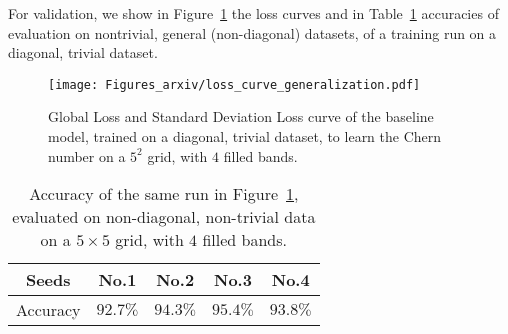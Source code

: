 For validation, we show in Figure~\ref{fig:diag-loss} the loss curves and in Table~\ref{tab:diag-acc} accuracies of evaluation on nontrivial, general (non-diagonal) datasets, of a training run on a diagonal, trivial dataset.
\begin{figure}
    \centering
    \texttt{[image: Figures\_arxiv/loss\_curve\_generalization.pdf]}
    \caption{Global Loss and Standard Deviation Loss curve of the baseline model, trained on a diagonal, trivial dataset, to learn the Chern number on a $5^2$ grid, with $4$ filled bands.}
    \label{fig:diag-loss}
\end{figure}
 \begin{table}[]
        \centering
        \caption{Accuracy of the same run in Figure~\ref{fig:diag-loss}, evaluated on 
 non-diagonal, non-trivial data on a $5\times 5$ grid, with $4$ filled bands. }
        \label{tab:diag-acc}
        \vspace{10pt}
        \begin{tabular}{ccccc}
            \toprule
             Seeds&  No.1&No.2&No.3&No.4 \\
             \midrule
             Accuracy& $92.7\%$& $94.3\%$& $95.4\%$& $93.8\%$\\
             \bottomrule
        \end{tabular}

    \end{table}
